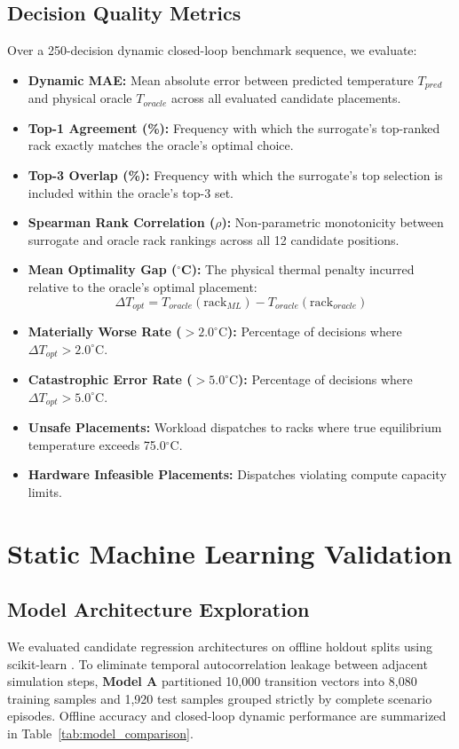\documentclass[conference,10pt]{IEEEtran}
\begin{document}
\subsection{Decision Quality Metrics}
Over a 250-decision dynamic closed-loop benchmark sequence, we evaluate:
\begin{itemize}
    \item \textbf{Dynamic MAE:} Mean absolute error between predicted temperature $T_{pred}$ and physical oracle $T_{oracle}$ across all evaluated candidate placements.
    \item \textbf{Top-1 Agreement (\%):} Frequency with which the surrogate's top-ranked rack exactly matches the oracle's optimal choice.
    \item \textbf{Top-3 Overlap (\%):} Frequency with which the surrogate's top selection is included within the oracle's top-3 set.
    \item \textbf{Spearman Rank Correlation ($\rho$):} Non-parametric monotonicity between surrogate and oracle rack rankings across all 12 candidate positions.
    \item \textbf{Mean Optimality Gap ($^\circ$C):} The physical thermal penalty incurred relative to the oracle's optimal placement:
    \begin{equation}
    \Delta T_{opt} = T_{oracle}(\text{rack}_{ML}) - T_{oracle}(\text{rack}_{oracle})
    \end{equation}
    \item \textbf{Materially Worse Rate ($>2.0^\circ\text{C}$):} Percentage of decisions where $\Delta T_{opt} > 2.0^\circ\text{C}$.
    \item \textbf{Catastrophic Error Rate ($>5.0^\circ\text{C}$):} Percentage of decisions where $\Delta T_{opt} > 5.0^\circ\text{C}$.
    \item \textbf{Unsafe Placements:} Workload dispatches to racks where true equilibrium temperature exceeds 75.0$^\circ$C.
    \item \textbf{Hardware Infeasible Placements:} Dispatches violating compute capacity limits.
\end{itemize}

\section{Static Machine Learning Validation}
\label{sec:static_ml}

\subsection{Model Architecture Exploration}
We evaluated candidate regression architectures on offline holdout splits using scikit-learn \cite{pedregosa2011scikit}. To eliminate temporal autocorrelation leakage between adjacent simulation steps, \textbf{Model A} partitioned 10,000 transition vectors into 8,080 training samples and 1,920 test samples grouped strictly by complete scenario episodes. Offline accuracy and closed-loop dynamic performance are summarized in Table~\ref{tab:model_comparison}.
\end{document}
